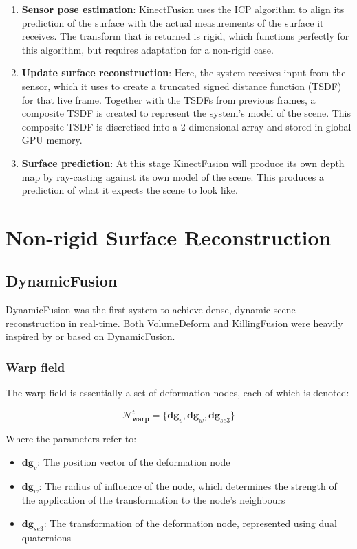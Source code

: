 \documentclass[12pt,twoside]{report}
\begin{document}
\begin{enumerate}
\item \textbf{Sensor pose estimation}: KinectFusion uses the ICP algorithm to align its prediction of the surface with the actual measurements of the surface it receives. The transform that is returned is rigid, which functions perfectly for this algorithm, but requires adaptation for a non-rigid case. 

\item \textbf{Update surface reconstruction}: Here, the system receives input from the sensor, which it uses to create a truncated signed distance function (TSDF) for that live frame. Together with the TSDFs from previous frames, a composite TSDF is created to represent the system's model of the scene. This composite TSDF is discretised into a 2-dimensional array and stored in global GPU memory.

\item \textbf{Surface prediction}: At this stage KinectFusion will produce its own depth map by ray-casting against its own model of the scene. This produces a prediction of what it expects the scene to look like.
\end{enumerate}


\section{Non-rigid Surface Reconstruction}
\subsection{DynamicFusion}

DynamicFusion was the first system to achieve dense, dynamic scene reconstruction in real-time. Both VolumeDeform and KillingFusion were heavily inspired by or based on DynamicFusion.

\subsubsection{Warp field}

The warp field is essentially a set of deformation nodes, each of which is denoted:

$$\mathcal{N}^t_{\textbf{warp}}=\{ \textbf{dg}_v, \textbf{dg}_w, \textbf{dg}_{se3} \}$$

Where the parameters refer to:

\begin{itemize}
\item $\textbf{dg}_v$: The position vector of the deformation node

\item $\textbf{dg}_w$: The radius of influence of the node, which determines the strength of the application of the transformation to the node's neighbours

\item $\textbf{dg}_{se3}$: The transformation of the deformation node, represented using dual quaternions
\end{itemize}
\end{document}
